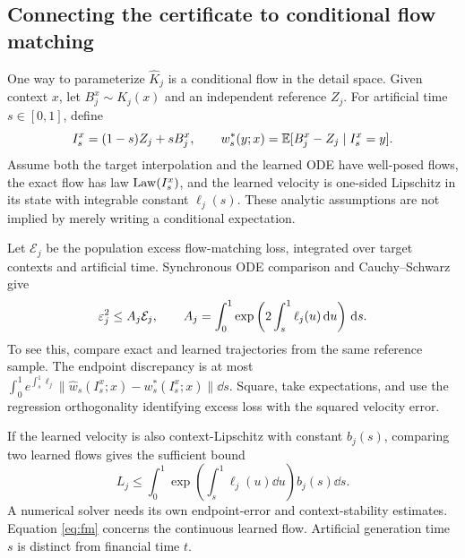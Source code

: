 \subsection{Connecting the certificate to conditional flow matching}
One way to parameterize $\widehat K_j$ is a conditional flow in the detail space. Given context $x$, let $B_j^x\sim K_j(x)$ and an independent reference $Z_j$. For artificial time $s\in[0,1]$, define
\[
 I_s^x=(1-s)Z_j+sB_j^x,\qquad
 w_s^*(y;x)=\mathbb E[B_j^x-Z_j\mid I_s^x=y].
\]
Assume both the target interpolation and the learned ODE have well-posed flows, the exact flow has law $\operatorname{Law}(I_s^x)$, and the learned velocity is one-sided Lipschitz in its state with integrable constant $\ell_j(s)$. These analytic assumptions are not implied by merely writing a conditional expectation.

Let $\mathcal E_j$ be the population excess flow-matching loss, integrated over target contexts and artificial time. Synchronous ODE comparison and Cauchy--Schwarz give
\begin{equation}\label{eq:fm}
 \varepsilon_j^2\le A_j\mathcal E_j,\qquad
 A_j=\int_0^1\exp\left(2\int_s^1\ell_j(u)\,\mathrm d u\right)\,\mathrm d s.
\end{equation}
To see this, compare exact and learned trajectories from the same reference sample. The endpoint discrepancy is at most
$\int_0^1e^{\int_s^1\ell_j}\|\widehat w_s(I_s^x;x)-w_s^*(I_s^x;x)\|\dd s$.
Square, take expectations, and use the regression orthogonality identifying excess loss with the squared velocity error.

If the learned velocity is also context-Lipschitz with constant $b_j(s)$, comparing two learned flows gives the sufficient bound
\[
 L_j\le\int_0^1\exp\left(\int_s^1\ell_j(u)\dd u\right)b_j(s)\dd s.
\]
A numerical solver needs its own endpoint-error and context-stability estimates. Equation \eqref{eq:fm} concerns the continuous learned flow. Artificial generation time $s$ is distinct from financial time $t$.

